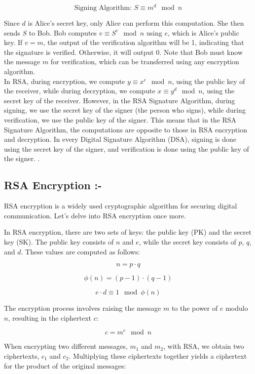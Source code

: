 \documentclass[11pt]{article}
\begin{document}
\[
\text{Signing Algorithm: } S \equiv m^d \mod n
\]

Since \( d \) is Alice's secret key, only Alice can perform this computation. She then sends \( S \) to Bob. Bob computes \( v \equiv S^e \mod n \) using \( e \), which is Alice's public key. If \( v = m \), the output of the verification algorithm will be 1, indicating that the signature is verified. Otherwise, it will output 0. Note that Bob must know the message \( m \) for verification, which can be transferred using any encryption algorithm.\\

In RSA, during encryption, we compute \( y \equiv x^e \mod n \), using the public key of the receiver, while during decryption, we compute \( x \equiv y^d \mod n \), using the secret key of the receiver. However, in the RSA Signature Algorithm, during signing, we use the secret key of the signer (the person who signs), while during verification, we use the public key of the signer. This means that in the RSA Signature Algorithm, the computations are opposite to those in RSA encryption and decryption. In every Digital Signature Algorithm (DSA), signing is done using the secret key of the signer, and verification is done using the public key of the signer.
.\\

\subsection{RSA Encryption :- }
RSA encryption is a widely used cryptographic algorithm for securing digital communication. Let's delve into RSA encryption once more.

In RSA encryption, there are two sets of keys: the public key (PK) and the secret key (SK). The public key consists of \( n \) and \( e \), while the secret key consists of \( p \), \( q \), and \( d \). These values are computed as follows:

\[ n = p \cdot q \]

\[ \phi(n) = (p - 1) \cdot (q - 1) \]

\[ e \cdot d \equiv 1 \mod \phi(n) \]

The encryption process involves raising the message \( m \) to the power of \( e \) modulo \( n \), resulting in the ciphertext \( c \):

\[ c = m^e \mod n \]

When encrypting two different messages, \( m_1 \) and \( m_2 \), with RSA, we obtain two ciphertexts, \( c_1 \) and \( c_2 \). Multiplying these ciphertexts together yields a ciphertext for the product of the original messages:
\end{document}
